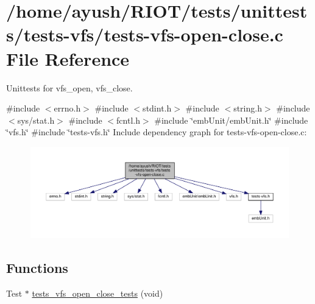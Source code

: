 \hypertarget{tests-vfs-open-close_8c}{}\section{/home/ayush/\+R\+I\+O\+T/tests/unittests/tests-\/vfs/tests-\/vfs-\/open-\/close.c File Reference}
\label{tests-vfs-open-close_8c}


Unittests for vfs\+\_\+open, vfs\+\_\+close.  


{\ttfamily \#include $<$errno.\+h$>$}\newline
{\ttfamily \#include $<$stdint.\+h$>$}\newline
{\ttfamily \#include $<$string.\+h$>$}\newline
{\ttfamily \#include $<$sys/stat.\+h$>$}\newline
{\ttfamily \#include $<$fcntl.\+h$>$}\newline
{\ttfamily \#include \char`\"{}emb\+Unit/emb\+Unit.\+h\char`\"{}}\newline
{\ttfamily \#include \char`\"{}vfs.\+h\char`\"{}}\newline
{\ttfamily \#include \char`\"{}tests-\/vfs.\+h\char`\"{}}\newline
Include dependency graph for tests-\/vfs-\/open-\/close.c\+:
\nopagebreak
\begin{figure}[H]
\begin{center}
\leavevmode
\includegraphics[width=350pt]{tests-vfs-open-close_8c__incl}
\end{center}
\end{figure}
\subsection*{Functions}
\textbf{ }\par
\begin{DoxyCompactItemize}
\item 
Test $\ast$ \hyperlink{tests-vfs-open-close_8c_a1431c12e4a6d8b993b1c7ca0c93f9b26}{tests\+\_\+vfs\+\_\+open\+\_\+close\+\_\+tests} (void)
\end{DoxyCompactItemize}



